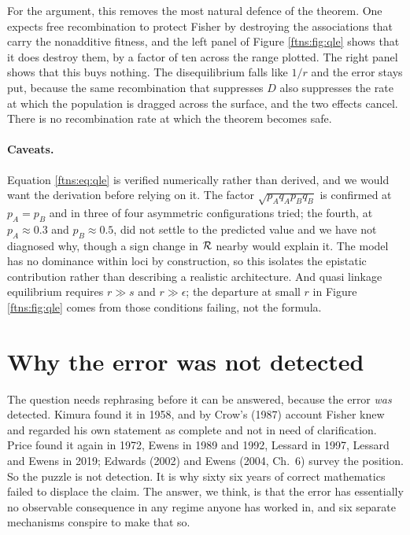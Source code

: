 For the argument, this removes the most natural defence of the theorem. One expects free
recombination to protect Fisher by destroying the associations that carry the nonadditive fitness,
and the left panel of Figure \ref{ftns:fig:qle} shows that it does destroy them, by a factor of ten
across the range plotted. The right panel shows that this buys nothing. The disequilibrium falls
like $1/r$ and the error stays put, because the same recombination that suppresses $D$ also
suppresses the rate at which the population is dragged across the surface, and the two effects
cancel. There is no recombination rate at which the theorem becomes safe.

\paragraph{Caveats.} Equation \eqref{ftns:eq:qle} is verified numerically rather than derived, and we would want the
derivation before relying on it. The factor $\sqrt{p_Aq_Ap_Bq_B}$ is confirmed at $p_A=p_B$ and in
three of four asymmetric configurations tried; the fourth, at $p_A\approx0.3$ and $p_B\approx0.5$,
did not settle to the predicted value and we have not diagnosed why, though a sign change in $\mathcal{R}$
nearby would explain it. The model has no dominance within loci by construction, so this isolates
the epistatic contribution rather than describing a realistic architecture. And quasi linkage
equilibrium requires $r\gg s$ and $r\gg\epsilon$; the departure at small $r$ in Figure \ref{ftns:fig:qle} comes from those conditions
failing, not the formula.

\section{Why the error was not detected}
\label{ftns:sec:undetected}

The question needs rephrasing before it can be answered, because the error \emph{was} detected.
Kimura found it in 1958, and by Crow's (1987) account Fisher knew and regarded his own statement as
complete and not in need of clarification. Price found it again in 1972, Ewens in 1989 and 1992, Lessard in
1997, Lessard and Ewens in 2019; Edwards (2002) and Ewens (2004, Ch.\ 6) survey the position. So the puzzle is not detection. It is why sixty six years of
correct mathematics failed to displace the claim. The answer, we think, is that the error has
essentially no observable consequence in any regime anyone has worked in, and six separate
mechanisms conspire to make that so.

